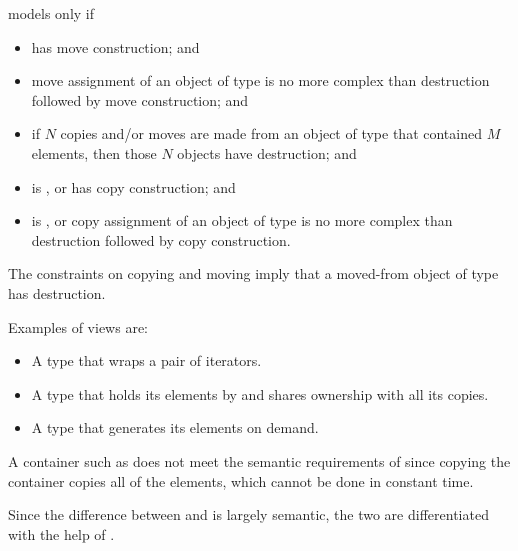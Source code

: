 \begin{itemdescr}
\pnum
{} models  only if
\begin{itemize}
\item
{} has  move construction; and

\item
move assignment of an object of type 
is no more complex than destruction followed by move construction; and

\item
if $N$ copies and/or moves are made from an object of type 
that contained $M$ elements,
then those $N$ objects have  destruction; and

\item
{} is , or
 has  copy construction; and

\item
{} is , or
copy assignment of an object of type 
is no more complex than destruction followed by copy construction.
\end{itemize}

\pnum
\begin{note}
The constraints on copying and moving imply that
a moved-from object of type  has  destruction.
\end{note}

\pnum
\begin{example}
Examples of views are:
\begin{itemize}
\item A  type that wraps a pair of iterators.

\item A  type that holds its elements by 
and shares ownership with all its copies.

\item A  type that generates its elements on demand.
\end{itemize}

A container such as 
does not meet the semantic requirements of 
since copying the container copies all of the elements,
which cannot be done in constant time.
\end{example}
\end{itemdescr}

\pnum
Since the difference between  and  is largely
semantic, the two are differentiated with the help of .

